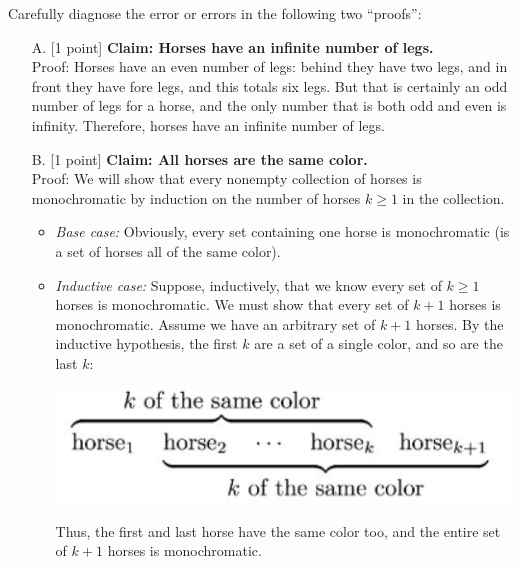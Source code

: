 \documentclass[12pt,letterpaper,boxed,cm]{hmcpset}
\begin{document}

\begin{problem}[1]
    [2 points] Carefully diagnose the error or errors in the following two “proofs”:
    \begin{enumerate}
        \item[A.] [1 point] \textbf{Claim: Horses have an infinite number of legs.}\\
        Proof: Horses have an even number of legs: behind they have two legs, and in front they have fore legs, and this totals six legs. But that is certainly an odd number of legs for a horse, and the only number that is both odd and even is infinity. Therefore, horses have an infinite number of legs.
        \item [B.] [1 point] \textbf{Claim: All horses are the same color.}\\
        Proof: We will show that every nonempty collection of horses is monochromatic by induction on the number of horses $k\ge1$ in the collection.
        \begin{itemize}
            \item \textit{Base case:} Obviously, every set containing one horse is monochromatic (is a set of horses all of the same color).
            \item \textit{Inductive case:} Suppose, inductively, that we know every set of $k \ge 1$ horses is monochromatic. We must show that every set of $k+1$ horses is monochromatic. Assume we have an arbitrary set of $k+1$ horses. By the inductive hypothesis, the first $k$ are a set of a single color, and so are the last $k$:
            \begin{center}
                \includegraphics[scale=.7]{01.JPG}
            \end{center}
            Thus, the first and last horse have the same color too, and the entire set of $k+1$ horses is monochromatic.
        \end{itemize}
    \end{enumerate}
\end{problem}

\begin{solution}
    \vfill
\end{solution}
\newpage
\end{document}
